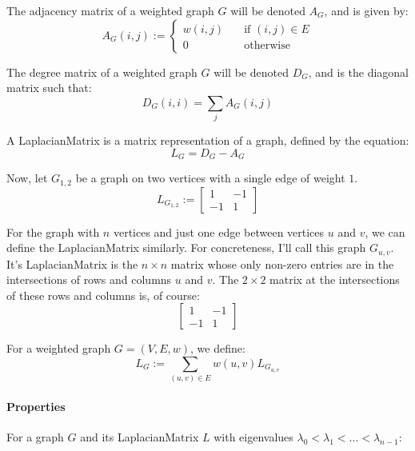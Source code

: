 The adjacency matrix of a weighted graph $G$ will be denoted $A_{G}$, and is
given by:
\begin{displaymath}
A_{G}(i,j) := 
    \left\{
        \begin{array}{ll}
            \mathit{w}(i,j) &   \quad \text{if $(i,j) \in E$} \\
            0 &                 \quad \text{otherwise}
        \end{array}
    \right.
\end{displaymath}

The degree matrix of a weighted graph $G$ will be denoted $D_{G}$, and is the
diagonal matrix such that:
\begin{displaymath}
D_{G}(i,i) = \sum_{j} A_{G}(i,j)
\end{displaymath}

A \gls{LaplacianMatrix} is a matrix representation of a graph, defined by the
equation:
\begin{displaymath}
L_{G} = D_{G} - A_{G}
\end{displaymath}

Now, let $G_{1,2}$ be a graph on two vertices with a single edge of weight $1$.
\begin{displaymath}
L_{G_{1,2}} :=
    \begin{bmatrix}
        1 & -1 \\
        -1 & 1
    \end{bmatrix}
\end{displaymath}

For the graph with $n$ vertices and just one edge between vertices $u$ and $v$, 
we can define the \gls{LaplacianMatrix} similarly. For concreteness, I'll call 
this graph $G_{u,v}$. It's \gls{LaplacianMatrix} is the $n{\times}n$ matrix 
whose only non-zero entries are in the intersections of rows and columns $u$ and
$v$. The $2{\times}2$ matrix at the intersections of these rows and columns is, 
of course:
\begin{displaymath}
    \begin{bmatrix}
        1 & -1 \\
        -1 & 1
    \end{bmatrix}
\end{displaymath}

For a weighted graph $G = (V,E,w)$, we define:
\begin{displaymath}
L_{G} := \sum_{(u,v) \in E} w(u,v)L_{G_{u,v}}
\end{displaymath}

\paragraph{Properties}
For a graph $G$ and its \gls{LaplacianMatrix} $L$ with eigenvalues 
$\lambda_{0} < \lambda_{1} < \ldots < \lambda_{n-1}$:

